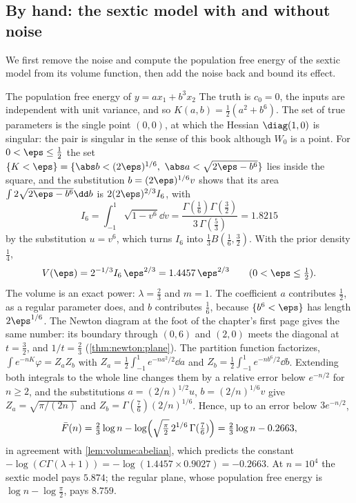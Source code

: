 \begin{refsection}
\section{By hand: the sextic model with and without noise}\label{sec:freeenergy:byhand}

We first remove the noise and compute the population free energy of the sextic model from its volume function, then add the noise back and bound its effect.

\begin{computation}{The population free energy of $y=ax_1+b^3x_2$}\label{comp:freeenergy:volume}
\step The truth is $c_0=0$, the inputs are independent with unit variance, and so $K(a,b)=\tfrac12(a^2+b^6)$. The set of true parameters is the single point $(0,0)$, at which the Hessian $\diag(1,0)$ is singular: the pair is singular in the sense of this book although $W_0$ is a point.
\step For $0<\eps\le\tfrac12$ the set $\{K<\eps\}=\{\abs b<(2\eps)^{1/6},\ \abs a<\sqrt{2\eps-b^6}\}$ lies inside the square, and the substitution $b=(2\eps)^{1/6}v$ shows that its area $\int2\sqrt{2\eps-b^6}\dd b$ is $2(2\eps)^{2/3}I_6$, with
\[
I_6=\int_{-1}^1\sqrt{1-v^6}\dd v=\frac{\Gamma(\frac16)\Gamma(\frac32)}{3\,\Gamma(\frac53)}=1.8215
\]
by the substitution $u=v^6$, which turns $I_6$ into $\tfrac13B(\tfrac16,\tfrac32)$. With the prior density $\tfrac14$,
\[
V(\eps)=2^{-1/3}I_6\,\eps^{2/3}=1.4457\,\eps^{2/3}\qquad(0<\eps\le\tfrac12).
\]
\step The volume is an exact power: $\lambda=\tfrac23$ and $m=1$. The coefficient $a$ contributes $\tfrac12$, as a regular parameter does, and $b$ contributes $\tfrac16$, because $\{b^6<\eps\}$ has length $2\eps^{1/6}$. The Newton diagram at the foot of the chapter's first page gives the same number: its boundary through $(0,6)$ and $(2,0)$ meets the diagonal at $t=\tfrac32$, and $1/t=\tfrac23$ (\cref{thm:newton:plane}).
\step The partition function factorizes, $\int e^{-nK}\varphi=Z_aZ_b$ with $Z_a=\tfrac12\int_{-1}^1e^{-na^2/2}\dd a$ and $Z_b=\tfrac12\int_{-1}^1e^{-nb^6/2}\dd b$. Extending both integrals to the whole line changes them by a relative error below $e^{-n/2}$ for $n\ge2$, and the substitutions $a=(2/n)^{1/2}u$, $b=(2/n)^{1/6}v$ give $Z_a=\sqrt{\pi/(2n)}$ and $Z_b=\Gamma(\tfrac76)(2/n)^{1/6}$. Hence, up to an error below $3e^{-n/2}$,
\[
\bar F(n)=\tfrac23\log n-\log\Bigl(\sqrt{\tfrac\pi2}\,2^{1/6}\,\Gamma(\tfrac76)\Bigr)=\tfrac23\log n-0.2663 ,
\]
in agreement with \cref{lem:volume:abelian}, which predicts the constant $-\log(C\Gamma(\lambda+1))=-\log(1.4457\times0.9027)=-0.2663$. At $n=10^4$ the sextic model pays $5.874$; the regular plane, whose population free energy is $\log n-\log\frac\pi2$, pays $8.759$.
\end{computation}


\end{refsection}
